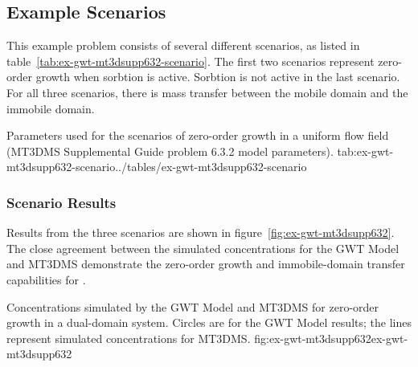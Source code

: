 \subsection{Example Scenarios}

This example problem consists of several different scenarios, as listed in table~\ref{tab:ex-gwt-mt3dsupp632-scenario}.  The first two scenarios represent zero-order growth when sorbtion is active.  Sorbtion is not active in the last scenario.  For all three scenarios, there is mass transfer between the mobile domain and the immobile domain.

\begin{ScenarioTable}{
                                   Parameters used for the scenarios of zero-order growth in a uniform flow field (MT3DMS Supplemental Guide problem 6.3.2 model parameters).
                                   }{tab:ex-gwt-mt3dsupp632-scenario}{../tables/ex-gwt-mt3dsupp632-scenario}
\end{ScenarioTable}


\subsubsection{Scenario Results}

Results from the three scenarios are shown in figure~\ref{fig:ex-gwt-mt3dsupp632}.  The close agreement between the simulated concentrations for the \mf GWT Model and MT3DMS demonstrate the zero-order growth and immobile-domain transfer capabilities for \mf.

\begin{StandardFigure}{
                                     Concentrations simulated by the \mf GWT Model and MT3DMS for zero-order growth in a dual-domain system.  Circles are for the GWT Model results; the lines represent simulated concentrations for MT3DMS.
                                     }{fig:ex-gwt-mt3dsupp632}{ex-gwt-mt3dsupp632}
\end{StandardFigure}                                 


